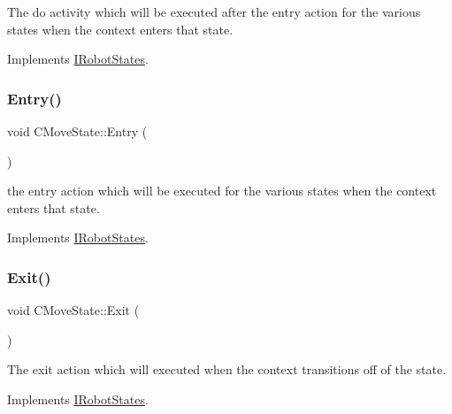 The do activity which will be executed after the entry action for the various states when the context enters that state. 



Implements \hyperlink{classIRobotStates_aa681381e72738a2870c3f13f552a2e93}{I\+Robot\+States}.

\mbox{\label{classCMoveState_ae9bda8d64d42c16e19facdfa8eb842e2}} 
\subsubsection{\texorpdfstring{Entry()}{Entry()}}
{\footnotesize\ttfamily void C\+Move\+State\+::\+Entry (\begin{DoxyParamCaption}{ }\end{DoxyParamCaption})\hspace{0.3cm}{\ttfamily [virtual]}}



the entry action which will be executed for the various states when the context enters that state. 



Implements \hyperlink{classIRobotStates_af43ddb52f5100b42c3d11b71fb1f10dd}{I\+Robot\+States}.

\mbox{\label{classCMoveState_ac6f27ce9a561ab6baf297e106d3f346d}} 
\subsubsection{\texorpdfstring{Exit()}{Exit()}}
{\footnotesize\ttfamily void C\+Move\+State\+::\+Exit (\begin{DoxyParamCaption}{ }\end{DoxyParamCaption})\hspace{0.3cm}{\ttfamily [virtual]}}



The exit action which will executed when the context transitions off of the state. 



Implements \hyperlink{classIRobotStates_a099417875e67f047ca38e08890491529}{I\+Robot\+States}.

\mbox{\label{classCMoveState_a49c6051142c4839e1a512f38859589ad}} 
